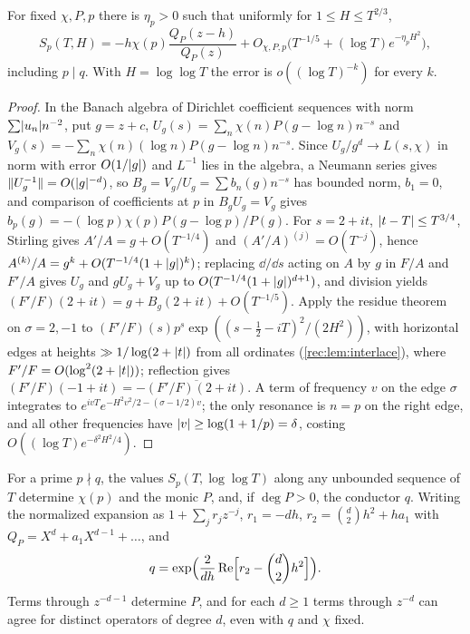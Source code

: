 \begin{theorem}\label{rec:thm:primefreq}
For fixed $\chi,P,p$ there is $\eta_p>0$ such that uniformly for $1\le H\le T^{2/3}$,
\[
 S_p(T,H)=-h\chi(p)\frac{Q_P(z-h)}{Q_P(z)}+O_{\chi,P,p}\bigl(T^{-1/5}+(\log T)e^{-\eta_pH^2}\bigr),
\]
including $p\mid q$. With $H=\log\log T$ the error is $o((\log T)^{-k})$ for every $k$.
\end{theorem}

\begin{proof}
In the Banach algebra of Dirichlet coefficient sequences with norm $\sum\abs{u_n}n^{-2}$, put $g=z+c$,
$U_g(s)=\sum_n\chi(n)P(g-\log n)n^{-s}$ and $V_g(s)=-\sum_n\chi(n)(\log n)P(g-\log n)n^{-s}$. Since
$U_g/g^d\to L(s,\chi)$ in norm with error $O(1/\abs g)$ and $L^{-1}$ lies in the algebra, a Neumann series
gives $\norm{U_g^{-1}}=O(\abs g^{-d})$, so $B_g=V_g/U_g=\sum b_n(g)n^{-s}$ has bounded norm, $b_1=0$, and
comparison of coefficients at $p$ in $B_gU_g=V_g$ gives $b_p(g)=-(\log p)\chi(p)P(g-\log p)/P(g)$. For
$s=2+it$, $\abs{t-T}\le T^{3/4}$, Stirling gives $A'/A=g+O(T^{-1/4})$ and $(A'/A)^{(j)}=O(T^{-j})$, hence
$A^{(k)}/A=g^k+O(T^{-1/4}(1+\abs g)^k)$; replacing $\dd/\dd s$ acting on $A$ by $g$ in $F/A$ and $F'/A$ gives $U_g$ and
$gU_g+V_g$ up to $O(T^{-1/4}(1+\abs g)^{d+1})$, and division yields $(F'/F)(2+it)=g+B_g(2+it)+O(T^{-1/5})$.
Apply the residue theorem on $\sigma=2,-1$ to $(F'/F)(s)p^s\exp((s-\tfrac12-iT)^2/(2H^2))$, with horizontal
edges at heights $\gg1/\log(2+\abs t)$ from all ordinates (\cref{rec:lem:interlace}), where
$F'/F=O(\log^2(2+\abs t))$; reflection gives $(F'/F)(-1+it)=-\overline{(F'/F)(2+it)}$. A term of frequency $v$ on
the edge $\sigma$ integrates to $e^{ivT}e^{-H^2v^2/2-(\sigma-1/2)v}$; the only resonance is $n=p$ on the right
edge, and all other frequencies have $\abs v\ge\log(1+1/p)=\delta$, costing $O((\log T)e^{-\delta^2H^2/4})$.
\end{proof}

\begin{theorem}\label{rec:thm:operatorinverse}
For a prime $p\nmid q$, the values $S_p(T,\log\log T)$ along any unbounded sequence of $T$ determine
$\chi(p)$ and the monic $P$, and, if $\deg P>0$, the conductor $q$. Writing the normalized expansion as
$1+\sum_jr_jz^{-j}$, $r_1=-dh$, $r_2=\binom d2h^2+ha_1$ with $Q_P=X^d+a_1X^{d-1}+\dots$, and
\[
 q=\exp\Bigl(\frac2{dh}\Re\Bigl[r_2-\binom d2h^2\Bigr]\Bigr).
\]
Terms through $z^{-d-1}$ determine $P$, and for each $d\ge1$ terms through $z^{-d}$ can agree for distinct
operators of degree $d$, even with $q$ and $\chi$ fixed.
\end{theorem}

